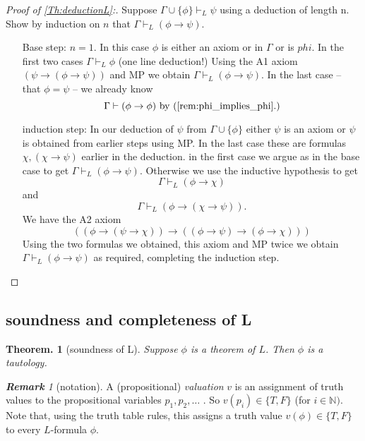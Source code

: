 \documentclass[a4paper,oneside,11pt,DIV=12,parskip=half]{scrartcl}
\newcommand{\N}{\mathbb N}
\theoremstyle{plain}
\newtheorem{theorem}{Theorem.}[section]
\theoremstyle{definition}
\newtheorem{remark, definition}[theorem]{Remark and Definition.}
\newtheorem{lemma, definition}[theorem]{Lemma and Definition.}
\newtheorem{theorem, definition}[theorem]{Theorem and Definition.}
\theoremstyle{remark}
\newtheorem*{remark}{\textbf{Remark}}
\newtheorem*{remark, example}{\textbf{Remark and Exercise}}
\begin{document}
\begin{proof}[Proof of \ref{Th:deductionL}:]
Suppose $\Gamma \cup \{\phi\} \vdash_L \psi$ using a deduction of length n. Show by induction on $n$ that $\Gamma \vdash_L (\phi \rightarrow \psi).$
\begin{itemize}
    \item[Base step:] $n = 1$. In this case $\phi$ is either an axiom or in $\Gamma$ or is $phi$. In the first two cases $\Gamma \vdash_L \phi$ (one line deduction!) Using the A1 axiom $(\psi \rightarrow (\phi \rightarrow \psi))$ and MP we obtain $\Gamma \vdash_L (\phi \rightarrow \psi)$.
    In the last case -- that $\phi = \psi$ -- we already know 
     \[ \Gamma \vdash (\phi \rightarrow \phi) \text{ by (\ref{rem:phi_implies_phi}.)} \]
    
     \item[induction step:] In our deduction of $\psi$ from $\Gamma \cup \{\phi\}$ either $\psi$ is an axiom or $\psi$ is obtained from earlier steps using MP. In the last case these are formulas $\chi, (\chi \rightarrow \psi)$ earlier in the deduction.
     in the first case we argue as in the base case to get $\Gamma \vdash_L (\phi \rightarrow \psi)$.
     Otherwise we use the inductive hypothesis to get $$\Gamma \vdash_L (\phi \rightarrow \chi)$$ and 
        \[ \Gamma \vdash_L (\phi \rightarrow (\chi \rightarrow \psi)). \]
    We have the A2 axiom 
        \[ ((\phi \rightarrow (\psi \rightarrow \chi)) \rightarrow ((\phi \rightarrow \psi) \rightarrow (\phi \rightarrow \chi))) \]
    Using the two formulas we obtained, this axiom and MP twice we obtain $\Gamma \vdash_L (\phi \rightarrow \psi)$ as required, completing the induction step.
\end{itemize}
\end{proof}

\subsection{soundness and completeness of L}

\begin{theorem}[soundness of L] \label{Th:soundnessL}
Suppose $\phi$ is a theorem of $L$. Then $\phi$ is a tautology.
\end{theorem}
\begin{remark}[notation]
 A (propositional) \emph{valuation} $v$ is an assignment of truth values to the propositional variables $p_1,p_2,\dots$ .
 So $v(p_i) \in \{ T, F \}$ (for $i \in \N)$.
 Note that, using the truth table rules, this assigns a truth value $v(\phi) \in \{ T, F \}$ to every $L$-formula $\phi$.
\end{remark}
\end{document}
